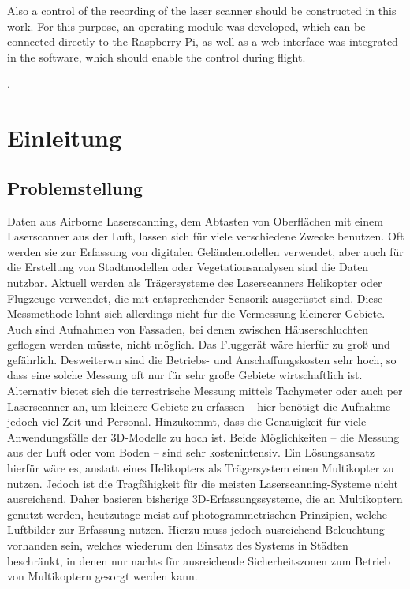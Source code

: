 \documentclass[a4paper,12pt,bibliography=totoc, listof=totoc,titlepage,pointlessnumbers]{scrreprt}
\begin{document}
Also a control of the recording of the laser scanner should be constructed in this work. For this purpose, an operating module was developed, which can be connected directly to the Rasp\-berry Pi, as well as a web interface was integrated in the software, which should enable the control during flight.


\providecommand{\citeTwo}[4]{\citep[{\citealp[#1]{#2};}][#3]{#4}} 
\providecommand{\citeThree}[6]{\citep[{\citealp[#1]{#2}; \citealp[#3]{#4};}][#5]{#6}} 
\providecommand{\citeFour}[8]{\citep[{\citealp[#1]{#2}; \citealp[#3]{#4}; \citealp[#5]{#6};}][#7]{#8}}.

\newpage

\tableofcontents
\newpage

\setcounter{page}{1} 

\chapter{Einleitung}

\section{Problemstellung}
Daten aus Air\-borne Laser\-scan\-ning, dem Abtasten von Oberflächen mit einem Laser\-scan\-ner aus der Luft, lassen sich für viele verschiedene Zwecke benutzen. Oft werden sie zur Erfassung von digitalen Geländemodellen verwendet, aber auch für die Erstellung von Stadtmodellen oder Vegetationsanalysen sind die Daten nutzbar. Aktuell werden als Trägersysteme des Laser\-scan\-ners Helikopter oder Flugzeuge verwendet, die mit entsprechender Sensorik ausgerüstet sind. Diese Messmethode lohnt sich allerdings nicht für die Vermessung kleinerer Gebiete. Auch sind Aufnahmen von Fassaden, bei denen zwischen Häuserschluchten geflogen werden müsste, nicht möglich. Das Fluggerät wäre hierfür zu groß und gefährlich. Desweiterwn sind die Betriebs- und Anschaffungskosten sehr hoch, so dass eine solche Messung oft nur für sehr große Gebiete wirtschaftlich ist. Alternativ bietet sich die terrestrische Messung mittels Tachymeter oder auch per Laser\-scan\-ner an, um kleinere Gebiete zu erfassen -- hier benötigt die Aufnahme jedoch viel Zeit und Personal. Hinzukommt, dass die Genauigkeit für viele Anwendungsfälle der 3D-Modelle zu hoch ist. Beide Möglichkeiten -- die Messung aus der Luft oder vom Boden -- sind sehr kostenintensiv. Ein Lösungsansatz hierfür wäre es, anstatt eines Helikopters als Trägersystem einen Multikopter zu nutzen. Jedoch ist die Tragfähigkeit für die meisten Laser\-scan\-ning-Systeme nicht ausreichend. Daher basieren bisherige 3D-Erfassungssysteme, die an Multikoptern genutzt werden, heutzutage meist auf photogrammetrischen Prinzipien, welche Luftbilder zur Erfassung nutzen. Hierzu muss jedoch ausreichend Beleuchtung vorhanden sein, welches wiederum den Einsatz des Systems in Städten beschränkt, in denen nur nachts für ausreichende Sicherheitszonen zum Betrieb von Multikoptern gesorgt werden kann. \citep{carlos}
\end{document}
